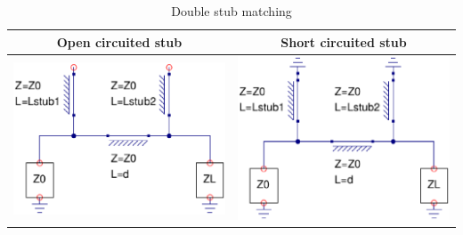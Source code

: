 \begin{table}[H]
  \centering
  \begin{tabular}{ | c | c | }
    \hline
    Open circuited stub & Short circuited stub\\ \hline
    \begin{minipage}{.4\textwidth}
      \includegraphics[width=\linewidth]{./images/Synthesis/Impedance_Matching/DoubleStubOpen}
    \end{minipage}
    &
    \begin{minipage}{.4\textwidth}
      \includegraphics[width=\linewidth]{./images/Synthesis/Impedance_Matching/DoubleStubShort}
    \end{minipage}
    \\ \hline
  \end{tabular}
  \caption{Double stub matching}\label{tbl:dblstub}
\end{table}


